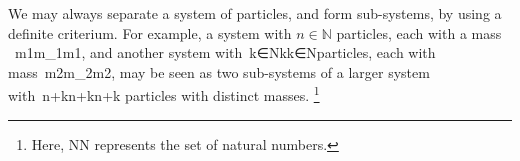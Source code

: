 We may always separate a system of particles, and form sub-systems, by using a definite criterium. For example, a system with $n\in\mathbb{N}$ particles, each with a mass  m1m_1m1​​, and another system with k∈Nk\in{}k∈N​ particles, each with mass m2m_2m2​​, may be seen as two sub-systems of a larger system with n+kn+kn+k​ particles with distinct masses. \footnote{Here, NN​ represents the set of natural numbers.}